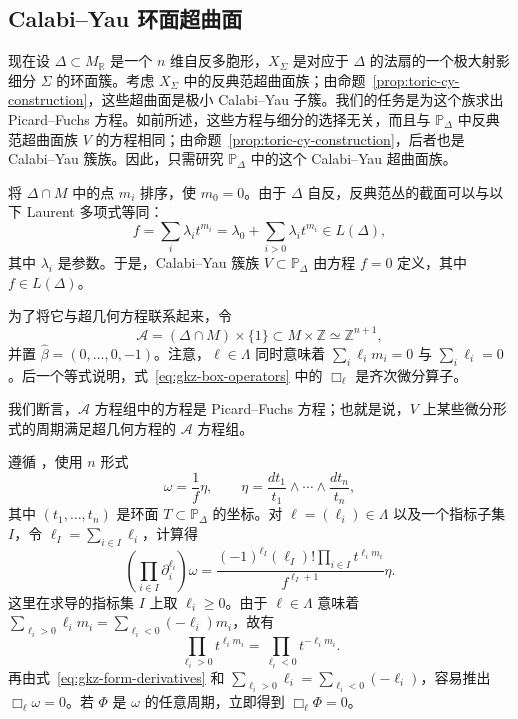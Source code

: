 \hypertarget{source:114-batch3}{}
\subsection{Calabi--Yau 环面超曲面}\label{subsec:toric-gkz}

现在设 $\Delta\subset M_{\mathbb R}$ 是一个 $n$ 维自反多胞形，$X_\Sigma$ 是对应于 $\Delta$ 的法扇的一个极大射影细分 $\Sigma$ 的环面簇。考虑 $X_\Sigma$ 中的反典范超曲面族；由命题~\ref{prop:toric-cy-construction}，这些超曲面是极小 Calabi--Yau 子簇。我们的任务是为这个族求出 Picard--Fuchs 方程。如前所述，这些方程与细分的选择无关，而且与 $\mathbb P_\Delta$ 中反典范超曲面族 $V$ 的方程相同；由命题~\ref{prop:toric-cy-construction}，后者也是 Calabi--Yau 簇族。因此，只需研究 $\mathbb P_\Delta$ 中的这个 Calabi--Yau 超曲面族。

将 $\Delta\cap M$ 中的点 $m_i$ 排序，使 $m_0=0$。由于 $\Delta$ 自反，反典范丛的截面可以与以下 Laurent 多项式等同：
\begin{equation}\label{eq:toric-gkz-laurent}
f=\sum_i\lambda_it^{m_i}=\lambda_0+\sum_{i>0}\lambda_it^{m_i}\in L(\Delta),
\end{equation}
其中 $\lambda_i$ 是参数。于是，Calabi--Yau 簇族 $V\subset\mathbb P_\Delta$ 由方程 $f=0$ 定义，其中 $f\in L(\Delta)$。

为了将它与超几何方程联系起来，令
\begin{equation}\label{eq:toric-gkz-configuration}
\mathcal A=(\Delta\cap M)\times\{1\}\subset M\times\mathbb Z\simeq\mathbb Z^{n+1},
\end{equation}
并置 $\widehat\beta=(0,\ldots,0,-1)$。注意，$\ell\in\Lambda$ 同时意味着 $\sum_i\ell_im_i=0$ 与 $\sum_i\ell_i=0$。后一个等式说明，式~\eqref{eq:gkz-box-operators} 中的 $\Box_\ell$ 是齐次微分算子。

我们断言，$\mathcal A$ 方程组中的方程是 Picard--Fuchs 方程；也就是说，$V$ 上某些微分形式的周期满足超几何方程的 $\mathcal A$ 方程组。

遵循 ，使用 $n$ 形式
\begin{equation}\label{eq:toric-gkz-rational-form}
\omega=\frac1f\eta,\qquad
\eta=\frac{dt_1}{t_1}\wedge\cdots\wedge\frac{dt_n}{t_n},
\end{equation}
其中 $(t_1,\ldots,t_n)$ 是环面 $T\subset\mathbb P_\Delta$ 的坐标。对 $\ell=(\ell_i)\in\Lambda$ 以及一个指标子集 $I$，令 $\ell_I=\sum_{i\in I}\ell_i$，计算得
\begin{equation}\label{eq:gkz-form-derivatives}
\left(\prod_{i\in I}\partial_i^{\ell_i}\right)\omega
=\frac{(-1)^{\ell_I}(\ell_I)!\prod_{i\in I}t^{\ell_im_i}}{f^{\ell_I+1}}\eta.
\end{equation}
这里在求导的指标集 $I$ 上取 $\ell_i\geq0$。由于 $\ell\in\Lambda$ 意味着
$\sum_{\ell_i>0}\ell_im_i=\sum_{\ell_i<0}(-\ell_i)m_i$，故有
\[
\prod_{\ell_i>0}t^{\ell_im_i}=\prod_{\ell_i<0}t^{-\ell_im_i}.
\]
再由式~\eqref{eq:gkz-form-derivatives} 和
$\sum_{\ell_i>0}\ell_i=\sum_{\ell_i<0}(-\ell_i)$，容易推出 $\Box_\ell\omega=0$。若 $\Phi$ 是 $\omega$ 的任意周期，立即得到 $\Box_\ell\Phi=0$。

